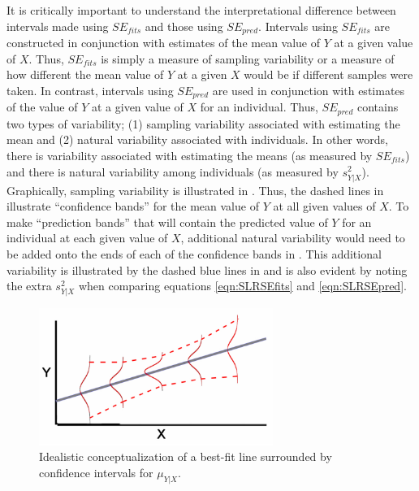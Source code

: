 \documentclass[10pt,openany]{book}\usepackage[]{graphicx}\usepackage[]{color}
\begin{document}

It is critically important to understand the interpretational difference between intervals made using $SE_{fits}$ and those using $SE_{pred}$.  Intervals using $SE_{fits}$ are constructed in conjunction with estimates of the mean value of $Y$ at a given value of $X$.  Thus, $SE_{fits}$ is simply a measure of sampling variability or a measure of how different the mean value of $Y$ at a given $X$ would be if different samples were taken.  In contrast, intervals using $SE_{pred}$ are used in conjunction with estimates of the value of $Y$ at a given value of $X$ for an individual.  Thus, $SE_{pred}$ contains two types of variability; (1) sampling variability associated with estimating the mean and (2) natural variability associated with individuals.  In other words, there is variability associated with estimating the means (as measured by $SE_{fits}$) and there is natural variability among individuals (as measured by $s_{Y|X}^{2}$).  Graphically, sampling variability is illustrated in .  Thus, the dashed lines in  illustrate ``confidence bands'' for the mean value of $Y$ at all given values of $X$.  To make ``prediction bands'' that will contain the predicted value of $Y$ for an individual at each given value of $X$, additional natural variability would need to be added onto the ends of each of the confidence bands in .  This additional variability is illustrated by the dashed blue lines in  and is also evident by noting the extra $s_{Y|X}^{2}$ when comparing equations \eqref{eqn:SLRSEfits} and \eqref{eqn:SLRSEpred}.

\begin{figure}[h]
  \centering
  \includegraphics[width=3in]{FigsStatic/SLR_Conf_Bands.jpg}
  \caption{Idealistic conceptualization of a best-fit line surrounded by confidence intervals for $\mu_{Y|X}$.}\label{fig:SLRConfBands}
\end{figure}
\end{document}
